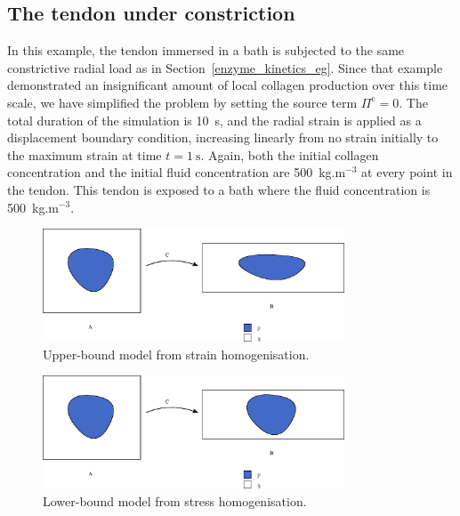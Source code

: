 \subsection{The tendon under constriction}
\label{constriction-1}

In this example, the tendon immersed in a bath is subjected to the same
constrictive radial load as in Section~\ref{enzyme_kinetics_eg}. Since
that example demonstrated an insignificant amount of local collagen production
over this time scale, we have simplified the
problem by setting the source term $\Pi^\mathrm{c} = 0$. The total
duration of the simulation is 
10~s, and the radial strain is applied as a displacement boundary
condition, increasing linearly from no strain initially to the maximum
strain at time $t = 1~\mathrm{s}$. Again,
both the initial collagen 
concentration and the initial fluid concentration are 500~kg.m$^{-3}$
at every point in the tendon. This tendon is exposed to a bath where
the fluid concentration is 500~kg.m$^{-3}$.

\begin{figure}[ht]
  \centering
  \includegraphics[width=0.8\textwidth]
                  {images/elucidation/homogeneous-deformation}
  \caption{Upper-bound model from strain homogenisation.}
  \label{upper-bound-model}
\end{figure}

\begin{figure}[ht]
  \centering
  \includegraphics[width=0.8\textwidth]
                  {images/elucidation/homogeneous-stress}
  \caption{Lower-bound model from stress homogenisation.}
  \label{lower-bound-model}
\end{figure}

